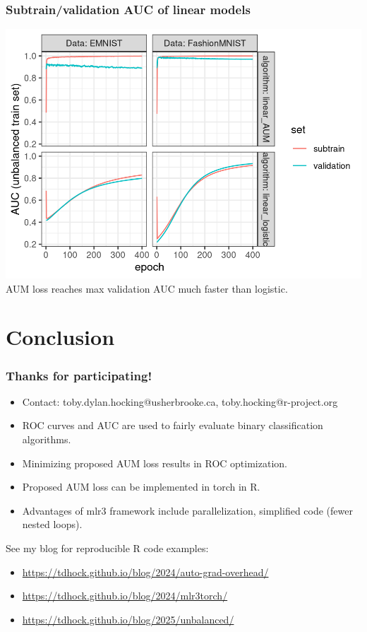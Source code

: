 \documentclass{beamer}
\begin{document}
\begin{frame}
  \frametitle{Subtrain/validation AUC of linear models}
  \includegraphics[width=\textwidth]{2025-04-04-nnet_prop0.01-train-auc}
  AUM loss reaches max validation AUC much faster than logistic.
\end{frame}



\section{Conclusion}
 
\begin{frame}
  \frametitle{Thanks for participating!}
  \begin{itemize}
  \item Contact: toby.dylan.hocking@usherbrooke.ca, toby.hocking@r-project.org
  \item ROC curves and AUC are used to fairly evaluate binary classification algorithms.
  \item Minimizing proposed AUM loss results in ROC optimization.
  \item Proposed AUM loss can be implemented in torch in R.
  \item Advantages of mlr3 framework include parallelization, simplified code (fewer nested loops).
  \end{itemize}
  See my blog for reproducible R code examples: \small
  \begin{itemize}
  \item \url{https://tdhock.github.io/blog/2024/auto-grad-overhead/}
  \item \url{https://tdhock.github.io/blog/2024/mlr3torch/}
  \item \url{https://tdhock.github.io/blog/2025/unbalanced/}
  \end{itemize}
\end{frame}
 
\end{document}
